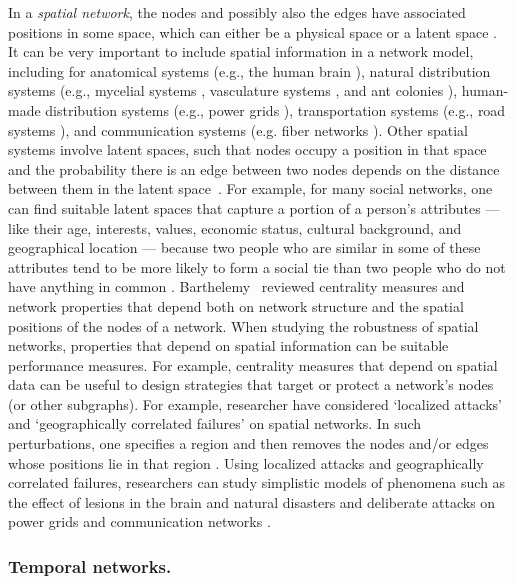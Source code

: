 \documentclass{comnet-mod}
\begin{document}
In a \textit{spatial network}, the nodes and possibly also the edges have associated positions in some space, which can either be a physical space or a latent space \cite{barthelemy2022}. It can be very important to include spatial information in a network model, including for anatomical systems (e.g., the human brain \cite{Alstott2009, Aerts2016}), natural distribution systems (e.g., mycelial systems \cite{Bebber2007, Papadopoulos2018}, vasculature systems \cite{Papadopoulos2018}, and ant colonies \cite{Cook2014}), human-made distribution systems (e.g., power grids \cite{Bernstein2014, Dong2018}), transportation systems (e.g., road systems \cite{Sakakibara2004, Deng2019}), and communication systems (e.g. fiber networks \cite{Neumayer2011, Deng2019}). Other spatial systems involve latent spaces, such that nodes occupy a position in that space and the probability there is an edge between two nodes depends on the distance between them in the latent space~\cite{boguna2021}. For example, for many social networks, one can find suitable latent spaces that capture a portion of a person's attributes --- like their age, interests, values, economic status, cultural background, and geographical location --- because two people who are similar in some of these attributes tend to be more likely to form a social tie than two people who do not have anything in common \cite{Light2020}. Barthelemy~\cite{barthelemy2022} reviewed centrality measures and network properties that depend both on network structure and the spatial positions of the nodes of a network. When studying the robustness of spatial networks, properties that depend on spatial information can be suitable performance measures. For example, centrality measures that depend on spatial data can be useful to design strategies that target or protect a network's nodes (or other subgraphs). For example, researcher have considered {`localized attacks'} \cite{Berezin2015, Shao2015, Vaknin2017, Dong2018, Deng2019} and {`geographically correlated failures'} \cite{Bernstein2014} on spatial networks. In such perturbations, one specifies a region and then removes the nodes and/or edges whose positions lie in that region \cite{Dong2018}. Using localized attacks and geographically correlated failures, researchers can study simplistic models of phenomena such as the effect of lesions in the brain \cite{Alstott2009} and natural disasters and deliberate attacks on power grids \cite{Bernstein2014, Dong2018} and communication networks \cite{Neumayer2011, Deng2019}.


\subsubsection{Temporal networks.}
\end{document}
